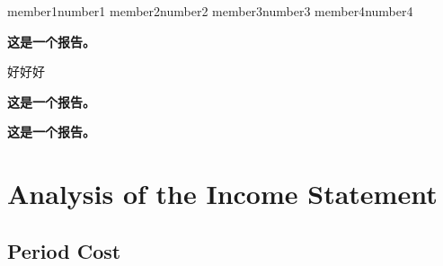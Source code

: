 \documentclass{coursereport}
\begin{document}
\maketitle


\theteammember
{member1}{number1}
{member2}{number2}
{member3}{number3}
{member4}{number4}

\begin{summary}
	\item \textbf{这是一个报告。}
	
	好好好
	\item \textbf{这是一个报告。}
	\item \textbf{这是一个报告。}
\end{summary}

\section{Analysis of the Income Statement}
\subsection{Period Cost}
\end{document}
